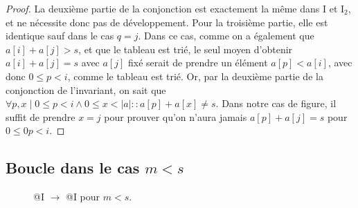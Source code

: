 \documentclass{elsarticle}
\newcommand{\abs}[1]{\left\lvert#1\right\lvert}
\begin{document}
\begin{minipage}[c]{0.5\textwidth}
\begin{proof}
La deuxième partie de la conjonction est exactement la même dans I et I$_2$,
et ne nécessite donc pas de développement.
Pour la troisième partie, elle est identique sauf dans le cas $q = j$.
Dans ce cas, comme on a également que $a[i] + a[j] > s$,
et que le tableau est trié, le seul moyen d'obtenir $a[i] + a[j] = s$ avec $a[j]$ fixé serait de prendre un élément $a[p] < a[i]$, avec donc $0 \le p < i$, comme le tableau est trié.
Or, par la deuxième partie de la conjonction de l'invariant, on sait que $\forall p, x \mid 0 \le p < i \land 0 \le x < \abs{a} :: a[p] + a[x] \ne s$.
Dans notre cas de figure, il suffit de prendre $x = j$ pour prouver qu'on n'aura jamais $a[p] + a[j] = s$ pour $0 \le 0 p < i$.
\end{proof}
\end{minipage}

\subsection{Boucle dans le cas $m < s$}
\noindent\begin{minipage}[c]{0.5\textwidth}
\centering
\begin{figure}[H]
	\centering
	
	\caption*{@I $\to$ @I pour $m < s$.}
	\label{fig:3}
\end{figure}
\end{minipage}%
\end{document}
